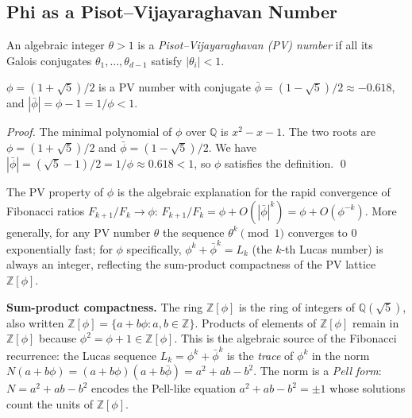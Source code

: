 \subsection{Phi as a Pisot--Vijayaraghavan Number}
\label{subsec:pisot-vijayaraghavan}

\begin{definition}[PV number]\label{def:pv-number}
An algebraic integer $\theta > 1$ is a
\emph{Pisot--Vijayaraghavan (PV) number} if all
its Galois conjugates $\theta_1, \ldots, \theta_{d-1}$
satisfy $|\theta_i| < 1$.
\end{definition}

\begin{proposition}\label{prop:phi-pv}
$\phi = (1+\sqrt{5})/2$ is a PV number with conjugate
$\bar{\phi} = (1-\sqrt{5})/2 \approx -0.618$, and
$|\bar\phi| = \phi - 1 = 1/\phi < 1$.
\end{proposition}

\begin{proof}
The minimal polynomial of $\phi$ over $\mathbb{Q}$
is $x^2 - x - 1$.  The two roots are
$\phi = (1+\sqrt{5})/2$ and
$\bar\phi = (1-\sqrt{5})/2$.  We have
$|\bar\phi| = (\sqrt{5}-1)/2 = 1/\phi \approx 0.618 < 1$,
so $\phi$ satisfies the definition.
\qed
\end{proof}

The PV property of $\phi$ is the algebraic
explanation for the rapid convergence of Fibonacci
ratios $F_{k+1}/F_k \to \phi$:
$F_{k+1}/F_k = \phi + O(|\bar\phi|^k) = \phi + O(\phi^{-k})$.
More generally, for any PV number $\theta$ the
sequence $\theta^k \pmod{1}$ converges to $0$
exponentially fast; for $\phi$ specifically,
$\phi^k + \bar\phi^k = L_k$ (the $k$-th Lucas
number) is always an integer, reflecting the
sum-product compactness of the PV lattice
$\mathbb{Z}[\phi]$.

\textbf{Sum-product compactness.}
The ring $\mathbb{Z}[\phi]$ is the ring of integers
of $\mathbb{Q}(\sqrt{5})$, also written
$\mathbb{Z}[\phi] = \{a + b\phi : a, b \in \mathbb{Z}\}$.
Products of elements of $\mathbb{Z}[\phi]$ remain
in $\mathbb{Z}[\phi]$ because
$\phi^2 = \phi + 1 \in \mathbb{Z}[\phi]$.
This is the algebraic source of the Fibonacci
recurrence: the Lucas sequence $L_k = \phi^k + \bar\phi^k$
is the \emph{trace} of $\phi^k$ in the norm
$N(a + b\phi) = (a+b\phi)(a+b\bar\phi) = a^2 + ab - b^2$.
The norm is a \emph{Pell form}: $N = a^2 + ab - b^2$
encodes the Pell-like equation $a^2 + ab - b^2 = \pm 1$
whose solutions count the units of $\mathbb{Z}[\phi]$.

